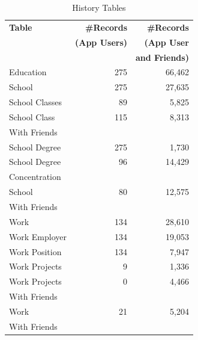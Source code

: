 \begin{table}
\centering
\caption{\small History Tables}
\label{tab:history}
\begin{tabular}{|>{\small}p{2cm}|>{\small}r|>{\small}r|}
\hline
\textbf{Table} & \textbf{\#Records} & \textbf{\#Records} \\
& \textbf{(App Users)} & \textbf{(App User} \\
& & \textbf{and Friends)} \\
\hline
Education & 275 & 66,462 \\
\hline
School & 275 & 27,635 \\
\hline
School Classes & 89 & 5,825 \\
\hline
School Class & 115 & 8,313 \\
With Friends & & \\
\hline
School Degree & 275 & 1,730 \\
\hline
School Degree & 96 & 14,429 \\
Concentration & & \\
\hline
School & 80 & 12,575 \\
With Friends & & \\
\hline
Work & 134 & 28,610 \\
\hline
Work Employer & 134 & 19,053 \\
\hline
Work Position & 134 & 7,947 \\
\hline
Work Projects & 9 & 1,336 \\
\hline
Work Projects & 0 & 4,466 \\
With Friends & & \\
\hline
Work & 21 & 5,204 \\
With Friends & & \\
\hline
\end{tabular}
\end{table}







